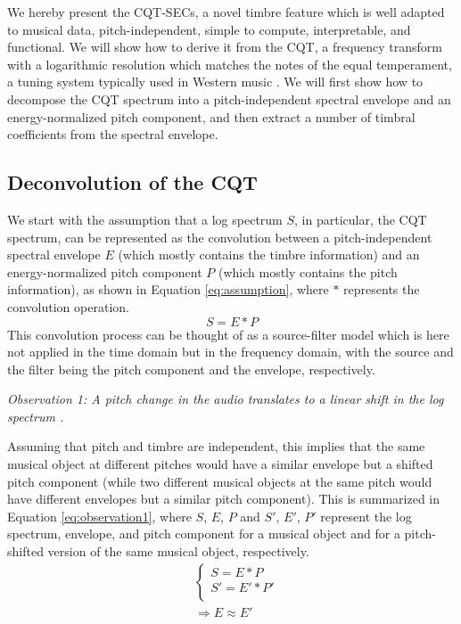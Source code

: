 \documentclass[journal]{IEEEtran}
\begin{document}
We hereby present the CQT-SECs, a novel timbre feature which is well adapted to musical data, pitch-independent, simple to compute, interpretable, and functional. We will show how to derive it from the CQT, a frequency transform with a logarithmic resolution which matches the notes of the equal temperament, a tuning system typically used in Western music \cite{brown1991, brown1992}. We will first show how to decompose the CQT spectrum into a pitch-independent spectral envelope and an energy-normalized pitch component, and then extract a number of timbral coefficients from the spectral envelope. 

\subsection{Deconvolution of the CQT}

We start with the assumption that a log spectrum $S$, in particular, the CQT spectrum, can be represented as the convolution between a pitch-independent spectral envelope $E$ (which mostly contains the timbre information) and an energy-normalized pitch component $P$ (which mostly contains the pitch information), as shown in Equation \ref{eq:assumption}, where $*$ represents the convolution operation. 
\begin{equation}
\label{eq:assumption}
S = E * P
\end{equation}
This convolution process can be thought of as a source-filter model \cite{fant1970} which is here not applied in the time domain but in the frequency domain, with the source and the filter being the pitch component and the envelope, respectively.

\emph{Observation 1: A pitch change in the audio translates to a linear shift in the log spectrum \cite{brown1991, brown1992}.}

Assuming that pitch and timbre are independent, this implies that the same musical object at different pitches would have a similar envelope but a shifted pitch component (while two different musical objects at the same pitch would have different envelopes but a similar pitch component). This is summarized in Equation \ref{eq:observation1}, where $S$, $E$, $P$ and $S'$, $E'$, $P'$ represent the log spectrum, envelope, and pitch component for a musical object and for a pitch-shifted version of the same musical object, respectively.
\begin{equation}
\label{eq:observation1}
\begin{split}
& \begin{cases}
S = E * P \\
S' = E' * P' \\
\end{cases} \\
& \Rightarrow E \approx E'
\end{split}
\end{equation}
\end{document}
